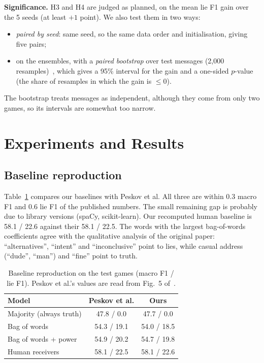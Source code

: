 \documentclass[conference]{IEEEtran}
\begin{document}
\textbf{Significance.} H3 and H4 are judged as planned, on the mean lie F1 gain over the 5 seeds (at least $+1$ point). We also test them in two ways:
\begin{itemize}
\item \emph{paired by seed}: same seed, so the same data order and initialisation, giving five pairs;
\item on the ensembles, with a \emph{paired bootstrap} over test messages (2,000 resamples)~\cite{efron1993bootstrap,bergkirkpatrick2012significance}, which gives a 95\% interval for the gain and a one-sided $p$-value (the share of resamples in which the gain is $\le 0$).
\end{itemize}
The bootstrap treats messages as independent, although they come from only two games, so its intervals are somewhat too narrow.

\section{Experiments and Results}
\label{sec:results}

\subsection{Baseline reproduction}
\label{sec:res-baselines}
Table~\ref{tab:baselines} compares our baselines with Peskov et al. All three are within 0.3 macro F1 and 0.6 lie F1 of the published numbers. The small remaining gap is probably due to library versions (spaCy, scikit-learn). Our recomputed human baseline is 58.1 / 22.6 against their 58.1 / 22.5. The words with the largest bag-of-words coefficients agree with the qualitative analysis of the original paper: ``alternatives'', ``intent'' and ``inconclusive'' point to lies, while casual address (``dude'', ``man'') and ``fine'' point to truth.

\begin{table}[t]
\centering
\caption{Baseline reproduction on the test games (macro F1 / lie F1). Peskov et al.'s values are read from Fig.~5 of~\cite{peskov2020takes}.}
\label{tab:baselines}
\begin{tabular}{lcc}
\toprule
Model & Peskov et al. & Ours \\
\midrule
Majority (always truth)  & 47.8 / \phantom{0}0.0 & 47.7 / \phantom{0}0.0 \\
Bag of words             & 54.3 / 19.1 & 54.0 / 18.5 \\
Bag of words + power     & 54.9 / 20.2 & 54.7 / 19.8 \\
Human receivers          & 58.1 / 22.5 & 58.1 / 22.6 \\
\bottomrule
\end{tabular}
\end{table}
\end{document}

